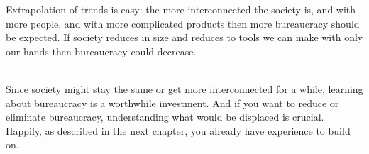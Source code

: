 
Extrapolation of trends is easy: the more interconnected the society is, and with more people, and with more complicated products then more bureaucracy should be expected. If society reduces in size and reduces to tools we can make with only our hands then bureaucracy could decrease. 


\ \\

Since society might stay the same or get more interconnected for a while, learning about bureaucracy is a worthwhile investment. And if you want to reduce or eliminate bureaucracy, understanding what would be displaced is crucial. 
Happily, as described in the next chapter, you already have experience to build on. 